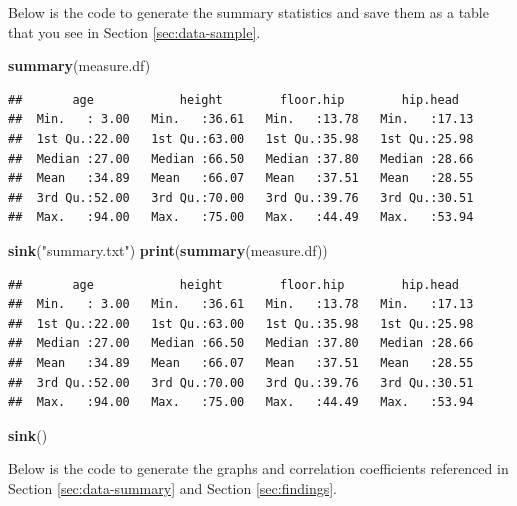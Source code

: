 \documentclass[]{article}
\newenvironment{Shaded}{\begin{snugshade}}{\end{snugshade}}
\newcommand{\KeywordTok}[1]{\textcolor[rgb]{0.13,0.29,0.53}{\textbf{#1}}}
\newcommand{\NormalTok}[1]{#1}
\newcommand{\StringTok}[1]{\textcolor[rgb]{0.31,0.60,0.02}{#1}}
\begin{document}
Below is the code to generate the summary statistics and save them as a
table that you see in Section \ref{sec:data-sample}.

\begin{Shaded}
\begin{Highlighting}[]
\KeywordTok{summary}\NormalTok{(measure.df)}
\end{Highlighting}
\end{Shaded}

\begin{verbatim}
##       age            height        floor.hip        hip.head    
##  Min.   : 3.00   Min.   :36.61   Min.   :13.78   Min.   :17.13  
##  1st Qu.:22.00   1st Qu.:63.00   1st Qu.:35.98   1st Qu.:25.98  
##  Median :27.00   Median :66.50   Median :37.80   Median :28.66  
##  Mean   :34.89   Mean   :66.07   Mean   :37.51   Mean   :28.55  
##  3rd Qu.:52.00   3rd Qu.:70.00   3rd Qu.:39.76   3rd Qu.:30.51  
##  Max.   :94.00   Max.   :75.00   Max.   :44.49   Max.   :53.94
\end{verbatim}

\begin{Shaded}
\begin{Highlighting}[]
\KeywordTok{sink}\NormalTok{(}\StringTok{"summary.txt"}\NormalTok{)}
\KeywordTok{print}\NormalTok{(}\KeywordTok{summary}\NormalTok{(measure.df))}
\end{Highlighting}
\end{Shaded}

\begin{verbatim}
##       age            height        floor.hip        hip.head    
##  Min.   : 3.00   Min.   :36.61   Min.   :13.78   Min.   :17.13  
##  1st Qu.:22.00   1st Qu.:63.00   1st Qu.:35.98   1st Qu.:25.98  
##  Median :27.00   Median :66.50   Median :37.80   Median :28.66  
##  Mean   :34.89   Mean   :66.07   Mean   :37.51   Mean   :28.55  
##  3rd Qu.:52.00   3rd Qu.:70.00   3rd Qu.:39.76   3rd Qu.:30.51  
##  Max.   :94.00   Max.   :75.00   Max.   :44.49   Max.   :53.94
\end{verbatim}

\begin{Shaded}
\begin{Highlighting}[]
\KeywordTok{sink}\NormalTok{()}
\end{Highlighting}
\end{Shaded}

Below is the code to generate the graphs and correlation coefficients
referenced in Section \ref{sec:data-summary} and Section
\ref{sec:findings}.
\end{document}
